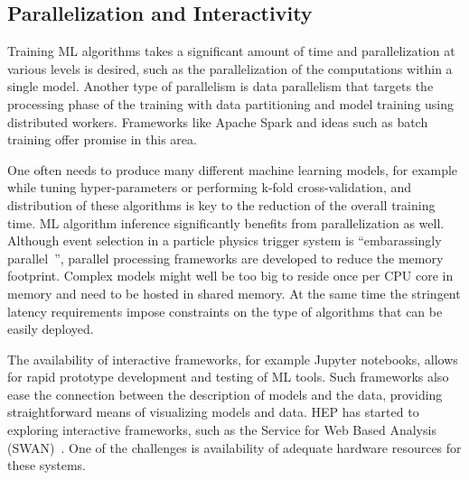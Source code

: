 \subsection{Parallelization and Interactivity}
Training ML algorithms takes a significant amount of time and parallelization at various levels is desired, such as the parallelization of the computations within a single model. Another type of parallelism is data parallelism that targets the processing phase of the training with data partitioning and model training using distributed workers. Frameworks like Apache Spark and ideas such as batch training offer promise in this area.

One often needs to produce many different machine learning models, for example while tuning hyper-parameters or performing k-fold cross-validation, and distribution of these algorithms is key to the reduction of the overall training time.
ML algorithm inference significantly benefits from parallelization as well. Although event selection in a particle physics trigger system is ``embarassingly parallel~\cite{embarrassingly}'', parallel processing frameworks are developed to reduce the memory footprint. Complex models might well be too big to reside once per CPU core in memory and need to be hosted in shared memory. At the same time the stringent latency requirements impose constraints on the type of algorithms that can be easily deployed.

The availability of interactive frameworks, for example Jupyter notebooks, allows for rapid prototype development and testing of ML tools. Such frameworks also ease the connection between the description of models and the data, providing straightforward means of visualizing models and data.
HEP has started to exploring interactive frameworks, such as the Service for Web Based Analysis (SWAN)~\cite{swan}. One of the challenges is availability of adequate hardware resources for these systems.


